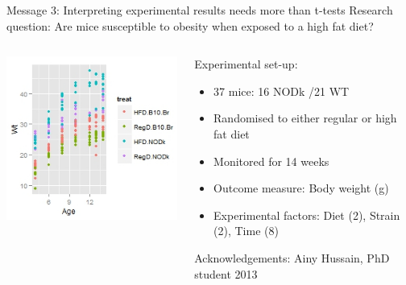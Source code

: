 \documentclass{beamer}
\begin{document}
\begin{frame}{Message 3: Interpreting experimental results needs more than t-tests}
 \pause
 Research question: Are mice susceptible to obesity when exposed to a high fat diet?
 
  \begin{columns}
    \begin{column}{0.5\textwidth}
	\begin{center}
	\includegraphics[width=\textwidth]{Figures/message3}
	\end{center}
    \end{column}
    
    \begin{column}{0.5\textwidth}
    \begin{block}{Experimental set-up:}
      \begin{itemize}
	\item 37 mice: 16 NODk /21 WT
	\item Randomised to either regular or high fat diet
	\item Monitored for 14 weeks
	\item Outcome measure: Body weight (g)
	\item Experimental factors: Diet (2), Strain (2), Time (8)
      \end{itemize}
      \end{block}
      \tiny Acknowledgements: Ainy Hussain, PhD student 2013
    \end{column}
  \end{columns}
   
\end{frame}
\end{document}
